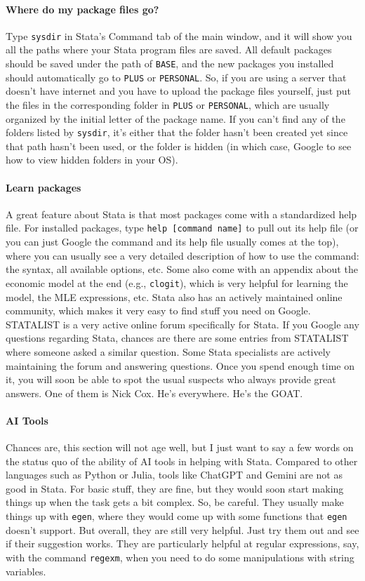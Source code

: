 \paragraph{Where do my package files go?} Type \verb|sysdir| in Stata's Command tab of the main window, and it will show you all the paths where your Stata program files are saved. All default packages should be saved under the path of \verb|BASE|, and the new packages you installed should automatically go to \verb|PLUS| or \verb|PERSONAL|. So, if you are using a server that doesn't have internet and you have to upload the package files yourself, just put the files in the corresponding folder in \verb|PLUS| or \verb|PERSONAL|, which are usually organized by the initial letter of the package name. If you can't find any of the folders listed by \verb|sysdir|, it's either that the folder hasn't been created yet since that path hasn't been used, or the folder is hidden (in which case, Google to see how to view hidden folders in your OS). 

\paragraph{Learn packages} A great feature about Stata is that most packages come with a standardized help file. For installed packages, type \verb|help [command name]| to pull out its help file (or you can just Google the command and its help file usually comes at the top), where you can usually see a very detailed description of how to use the command: the syntax, all available options, etc. Some also come with an appendix about the economic model at the end (e.g., \verb|clogit|), which is very helpful for learning the model, the MLE expressions, etc. Stata also has an actively maintained online community, which makes it very easy to find stuff you need on Google. STATALIST is a very active online forum specifically for Stata. If you Google any questions regarding Stata, chances are there are some entries from STATALIST where someone asked a similar question. Some Stata specialists are actively maintaining the forum and answering questions. Once you spend enough time on it, you will soon be able to spot the usual suspects who always provide great answers. One of them is Nick Cox. He's everywhere. He's the GOAT. 

\paragraph{AI Tools} Chances are, this section will not age well, but I just want to say a few words on the status quo of the ability of AI tools in helping with Stata. Compared to other languages such as Python or Julia, tools like ChatGPT and Gemini are not as good in Stata. For basic stuff, they are fine, but they would soon start making things up when the task gets a bit complex. So, be careful. They usually make things up with \verb|egen|, where they would come up with some functions that \verb|egen| doesn't support. But overall, they are still very helpful. Just try them out and see if their suggestion works. They are particularly helpful at regular expressions, say, with the command \verb|regexm|, when you need to do some manipulations with string variables. 

